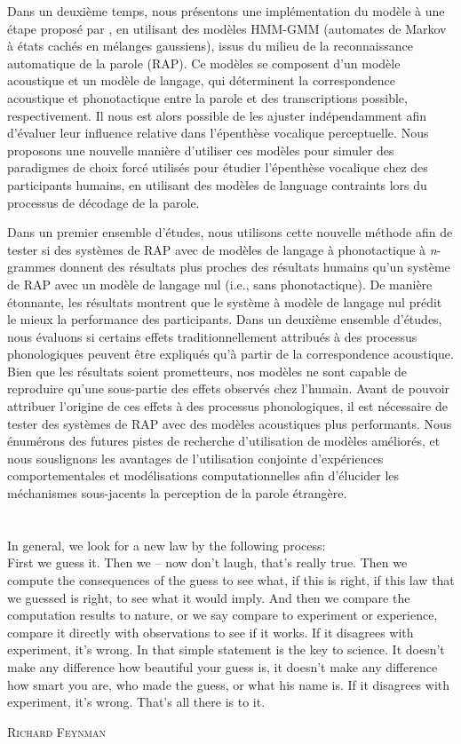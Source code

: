 \documentclass[12pt, twoside]{report}
\begin{document}
Dans un deuxième temps, nous présentons une implémentation du modèle à une étape proposé par \cite{wilson2013}, en utilisant des modèles HMM-GMM (automates de Markov à états cachés en mélanges gaussiens), issus du milieu de la reconnaissance automatique de la parole (RAP). Ce modèles se composent d'un modèle acoustique et un modèle de langage, qui déterminent la correspondence acoustique et phonotactique entre la parole et des transcriptions possible, respectivement. Il nous est alors possible de les ajuster indépendamment afin d'évaluer leur influence relative dans l'épenthèse vocalique perceptuelle. Nous proposons une nouvelle manière d'utiliser ces modèles pour simuler des paradigmes de choix forcé utilisés pour étudier l'épenthèse vocalique chez des participants humains, en utilisant des modèles de language contraints lors du processus de décodage de la parole.

Dans un premier ensemble d'études, nous utilisons cette nouvelle méthode afin de tester si des systèmes de RAP avec de modèles de langage à phonotactique à \textit{n}-grammes donnent des résultats plus proches des résultats humains qu'un système de RAP avec un modèle de langage nul (i.e., sans phonotactique). De manière étonnante, les résultats montrent que le système à modèle de langage nul prédit le mieux la performance des participants.
Dans un deuxième ensemble d'études, nous évaluons si certains effets traditionnellement attribués à des processus phonologiques peuvent être expliqués qu'à partir de la correspondence acoustique. Bien que les résultats soient prometteurs, nos modèles ne sont capable de reproduire qu'une sous-partie des effets observés chez l'humain. Avant de pouvoir attribuer l'origine de ces effets à des processus phonologiques, il est nécessaire de tester des systèmes de RAP avec des modèles acoustiques plus performants. Nous énumérons des futures pistes de recherche d'utilisation de modèles améliorés, et nous souslignons les avantages de l'utilisation conjointe d'expériences comportementales et modélisations computationnelles afin d'élucider les méchanismes sous-jacents la perception de la parole étrangère.  

\chapter*{}
\setlength{\epigraphwidth}{0.9\textwidth}

\epigraph{In general, we look for a new law by the following process: \\ First we guess it. Then we – now don't laugh, that's really true. Then we compute the consequences of the guess to see what, if this is right, if this law that we guessed is right, to see what it would imply. And then we compare the computation results to nature, or we say compare to experiment or experience, compare it directly with observations to see if it works. If it disagrees with experiment, it's wrong. In that simple statement is the key to science. It doesn't make any difference how beautiful your guess is, it doesn't make any difference how smart you are, who made the guess, or what his name is. If it disagrees with experiment, it's wrong. That's all there is to it.}{\textsc{Richard Feynman}}
\end{document}
